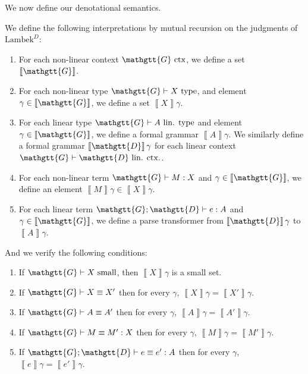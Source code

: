 \documentclass[acmsmall,nonacm]{acmart}
\renewcommand{\Gamma}{\mathgtt{G}}
\renewcommand{\Delta}{\mathgtt{D}}
\newcommand{\sem}[1]{\left\llbracket{#1}\right\rrbracket}
\newcommand{\theoryabbv}{$\textrm{Lambek}^D$\xspace}
\newcommand{\isTy}{\textrm{ type}}
\newcommand{\isCtx}{\textrm{ ctx}}
\newcommand{\isSmall}{\textrm{ small}}
\newcommand{\isLinTy}{\textrm{ lin. type}}
\newcommand{\isLinCtx}{\textrm{ lin. ctx.}}
\newcommand{\linctxwff}[2]{#1 \vdash #2 \isLinCtx}
\begin{document}
We now define our denotational semantics.
\begin{definition}
  We define the following interpretations by mutual recursion on the
  judgments of \theoryabbv:
  \begin{enumerate}
  \item For each non-linear context $\Gamma \isCtx$, we define a set $\sem \Gamma$.
  \item For each non-linear type $\Gamma \vdash X \isTy$, and element
    $\gamma \in \sem\Gamma$, we define a set $\sem X \gamma$.
  \item For each linear type $\Gamma \vdash A \isLinTy$ and element $\gamma
    \in \sem\Gamma$, we define a formal grammar $\sem{A}\gamma$. We
    similarly define a formal grammar $\sem\Delta\gamma$ for each
    linear context $\linctxwff \Gamma \Delta$.
  \item For each non-linear term $\Gamma \vdash M : X$ and $\gamma \in \sem{\Gamma}$, we define an element $\sem{M}\gamma \in \sem{X}\gamma$.
  \item For each linear term $\Gamma; \Delta \vdash e : A$ and $\gamma \in \sem{\Gamma}$, we define a parse transformer from $\sem{\Delta}\gamma$ to $\sem{A}\gamma$.
  \end{enumerate}
  And we verify the following conditions:
  \begin{enumerate}
  \item If $\Gamma \vdash X \isSmall$, then $\sem X \gamma$ is a small set.
  \item If $\Gamma \vdash X \equiv X'$ then for every $\gamma$, $\sem{X}\gamma = \sem{X'}\gamma$.
  \item If $\Gamma \vdash A \equiv A'$ then for every $\gamma$, $\sem{A}\gamma = \sem{A'}\gamma$.
  \item If $\Gamma \vdash M \equiv M' : X$ then for every $\gamma$, $\sem{M}\gamma = \sem{M'}\gamma$.
  \item If $\Gamma;\Delta \vdash e \equiv e' : A$ then for every $\gamma$, $\sem{e}\gamma = \sem{e'}\gamma$.
  \end{enumerate}
\end{definition}
\end{document}
